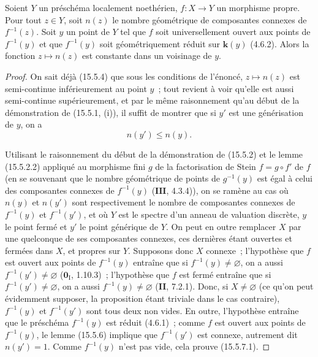 \begin{proposition}[15.5.7]
\label{IV.15.5.7-fr}
Soient $Y$ un préschéma localement noethérien, $f:X\to Y$ un morphisme propre. Pour tout $z\in Y$, soit $n(z)$ le nombre géométrique de composantes connexes de $f^{-1}(z)$. Soit $y$ un point de $Y$ tel que $f$ soit universellement ouvert aux points de $f^{-1}(y)$ et que $f^{-1}(y)$ soit géométriquement réduit sur $\mathbf{k}(y)$ (4.6.2). Alors la fonction $z\mapsto n(z)$ est constante dans un voisinage de $y$.
\end{proposition}

\begin{proof}
On sait déjà (15.5.4) que sous les conditions de l'énoncé, $z\mapsto n(z)$ est semi-continue inférieurement au point $y$~; tout revient à voir qu'elle est aussi semi-continue supérieurement, et par le même raisonnement qu'au début de la démonstration de (15.5.1, (i)), il suffit de montrer que si $y'$ est une générisation de $y$, on a
\begin{equation}
\tag{15.5.7.1}
\label{IV.15.5.7.1-fr}
  n(y')\leqslant n(y).
\end{equation}

Utilisant le raisonnement du début de la démonstration de (15.5.2) et le lemme (15.5.2.2) appliqué au morphisme fini $g$ de la factorisation de Stein $f=g\circ f'$ de $f$ (en se souvenant que le nombre géométrique de points de $g^{-1}(y)$ est égal à celui des composantes connexes de $f^{-1}(y)$ ($\mathbf{III}$, 4.3.4)), on se ramène au cas où $n(y)$ et $n(y')$ sont respectivement le nombre de composantes connexes de $f^{-1}(y)$ et $f^{-1}(y')$, et où $Y$ est le spectre d'un anneau de valuation discrète, $y$ le point fermé et $y'$ le point générique de $Y$. On peut en outre remplacer $X$ par une quelconque de ses composantes connexes, ces dernières étant ouvertes et fermées dans $X$, et propres sur $Y$. Supposons donc $X$ connexe~; l'hypothèse que $f$ est ouvert aux points de $f^{-1}(y)$ entraîne que si $f^{-1}(y)\ne\varnothing$, on a aussi $f^{-1}(y')\ne\varnothing$ ($\mathbf{0}_{\mathrm I}$, 1.10.3)~; l'hypothèse que $f$ est fermé entraîne que si $f^{-1}(y')\ne\varnothing$, on a aussi $f^{-1}(y)\ne\varnothing$ (\textbf{II}, 7.2.1). Donc, si $X\ne\varnothing$ (ce qu'on peut évidemment supposer, la proposition étant triviale dans le cas contraire), $f^{-1}(y)$ et $f^{-1}(y')$ sont tous deux non vides. En outre, l'hypothèse entraîne que le préschéma $f^{-1}(y)$ est réduit (4.6.1)~; comme $f$ est ouvert aux points de $f^{-1}(y)$, le lemme (15.5.6) implique que $f^{-1}(y')$ est connexe, autrement dit $n(y')=1$. Comme $f^{-1}(y)$ n'est pas vide, cela prouve (15.5.7.1).
\end{proof}

